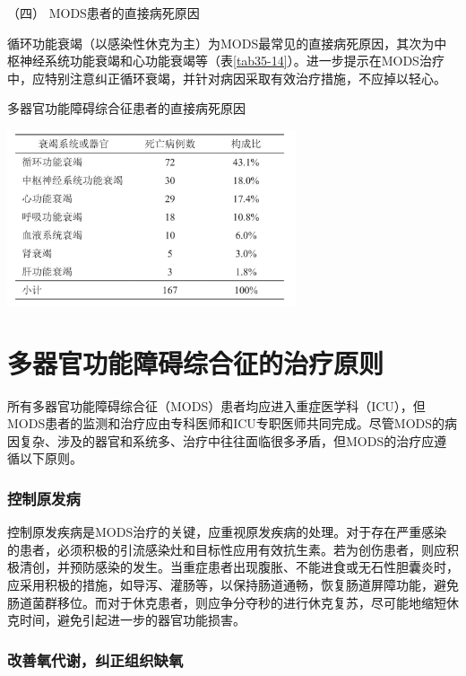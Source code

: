 \hypertarget{text00094.htmlux5cux23CHP3-11-3-5-4}{}
（四） MODS患者的直接病死原因

循环功能衰竭（以感染性休克为主）为MODS最常见的直接病死原因，其次为中枢神经系统功能衰竭和心功能衰竭等（表\ref{tab35-14}）。进一步提示在MODS治疗中，应特别注意纠正循环衰竭，并针对病因采取有效治疗措施，不应掉以轻心。

\begin{table}[htbp]
\centering
\caption{多器官功能障碍综合征患者的直接病死原因}
\label{tab35-14}
\includegraphics[width=3.35417in,height=2.04167in]{./images/Image00146.jpg}
\end{table}

\protect\hypertarget{text00095.html}{}{}

\section{多器官功能障碍综合征的治疗原则}

所有多器官功能障碍综合征（MODS）患者均应进入重症医学科（ICU），但MODS患者的监测和治疗应由专科医师和ICU专职医师共同完成。尽管MODS的病因复杂、涉及的器官和系统多、治疗中往往面临很多矛盾，但MODS的治疗应遵循以下原则。

\subsubsection{控制原发病}

控制原发疾病是MODS治疗的关键，应重视原发疾病的处理。对于存在严重感染的患者，必须积极的引流感染灶和目标性应用有效抗生素。若为创伤患者，则应积极清创，并预防感染的发生。当重症患者出现腹胀、不能进食或无石性胆囊炎时，应采用积极的措施，如导泻、灌肠等，以保持肠道通畅，恢复肠道屏障功能，避免肠道菌群移位。而对于休克患者，则应争分夺秒的进行休克复苏，尽可能地缩短休克时间，避免引起进一步的器官功能损害。

\subsubsection{改善氧代谢，纠正组织缺氧}


